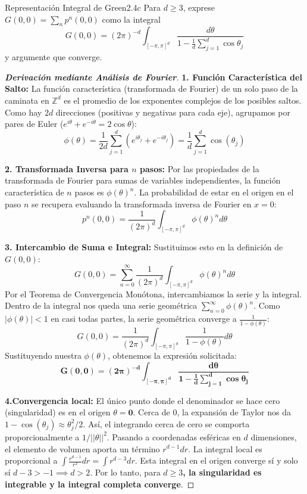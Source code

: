 \documentclass[10pt,a4paper]{article}
\begin{document}
\newpage

\begin{ejercicio}{Representación Integral de Green}{2.4c}
    Para $d \ge 3$, exprese $G(0,0) = \sum_n p^n(0,0)$ como la integral 
    \[ G(0,0) = (2\pi)^{-d} \int_{[-\pi, \pi]^d} \frac{d\theta}{1 - \frac{1}{d} \sum_{j=1}^d \cos \theta_j} \]
    y argumente que converge.
\end{ejercicio}

\begin{proof}[\textbf{Derivación mediante Análisis de Fourier}]
    \textbf{1. Función Característica del Salto:} 
    La función característica (transformada de Fourier) de un solo paso de la caminata en $\mathbb{Z}^d$ es el promedio de los exponentes complejos de los posibles saltos. Como hay $2d$ direcciones (positivas y negativas para cada eje), agrupamos por pares de Euler ($e^{i\theta} + e^{-i\theta} = 2\cos\theta$):
    \[ \phi(\theta) = \frac{1}{2d} \sum_{j=1}^d \left( e^{i\theta_j} + e^{-i\theta_j} \right) = \frac{1}{d} \sum_{j=1}^d \cos(\theta_j) \]
    
    \textbf{2. Transformada Inversa para $n$ pasos:} 
    Por las propiedades de la transformada de Fourier para sumas de variables independientes, la función característica de $n$ pasos es $\phi(\theta)^n$.
    La probabilidad de estar en el origen en el paso $n$ se recupera evaluando la transformada inversa de Fourier en $x=0$:
    \[ p^n(0,0) = \frac{1}{(2\pi)^d} \int_{[-\pi, \pi]^d} \phi(\theta)^n d\theta \]
    
    \textbf{3. Intercambio de Suma e Integral:} 
    Sustituimos esto en la definición de $G(0,0)$:
    \[ G(0,0) = \sum_{n=0}^{\infty} \frac{1}{(2\pi)^d} \int_{[-\pi, \pi]^d} \phi(\theta)^n d\theta \]
    Por el Teorema de Convergencia Monótona, intercambiamos la serie y la integral. Dentro de la integral nos queda una serie geométrica $\sum_{n=0}^{\infty} \phi(\theta)^n$.
    Como $|\phi(\theta)| < 1$ en casi todas partes, la serie geométrica converge a $\frac{1}{1 - \phi(\theta)}$:
    \[ G(0,0) = \frac{1}{(2\pi)^d} \int_{[-\pi, \pi]^d} \frac{1}{1 - \phi(\theta)} d\theta \]
    Sustituyendo nuestra $\phi(\theta)$, obtenemos la expresión solicitada:
    \[ \mathbf{G(0,0) = (2\pi)^{-d} \int_{[-\pi, \pi]^d} \frac{d\theta}{1 - \frac{1}{d} \sum_{j=1}^d \cos \theta_j}} \]

    \textbf{4.Convergencia local:}
    El único punto donde el denominador se hace cero (singularidad) es en el origen $\theta = \mathbf{0}$. Cerca de $0$, la expansión de Taylor nos da $1 - \cos(\theta_j) \approx \theta_j^2/2$. 
    Así, el integrando cerca de cero se comporta proporcionalmente a $1/||\theta||^2$. 
    Pasando a coordenadas esféricas en $d$ dimensiones, el elemento de volumen aporta un término $r^{d-1}dr$. La integral local es proporcional a $\int \frac{r^{d-1}}{r^2} dr = \int r^{d-3} dr$. 
    Esta integral en el origen converge sí y solo sí $d-3 > -1 \implies d > 2$. Por lo tanto, para \textbf{$d \ge 3$, la singularidad es integrable y la integral completa converge}.
\end{proof}
\end{document}
